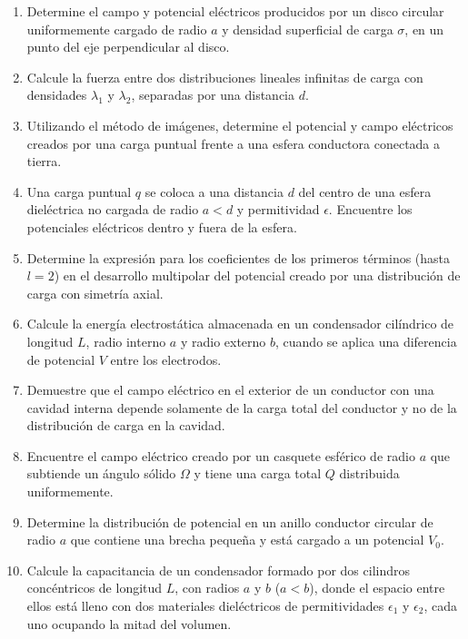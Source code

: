 \documentclass[12pt,a4paper]{book}
\begin{document}
\begin{enumerate}
\item Determine el campo y potencial eléctricos producidos por un disco circular uniformemente cargado de radio $a$ y densidad superficial de carga $\sigma$, en un punto del eje perpendicular al disco.

\item Calcule la fuerza entre dos distribuciones lineales infinitas de carga con densidades $\lambda_1$ y $\lambda_2$, separadas por una distancia $d$.

\item Utilizando el método de imágenes, determine el potencial y campo eléctricos creados por una carga puntual frente a una esfera conductora conectada a tierra.

\item Una carga puntual $q$ se coloca a una distancia $d$ del centro de una esfera dieléctrica no cargada de radio $a < d$ y permitividad $\epsilon$. Encuentre los potenciales eléctricos dentro y fuera de la esfera.

\item Determine la expresión para los coeficientes de los primeros términos (hasta $l=2$) en el desarrollo multipolar del potencial creado por una distribución de carga con simetría axial.

\item Calcule la energía electrostática almacenada en un condensador cilíndrico de longitud $L$, radio interno $a$ y radio externo $b$, cuando se aplica una diferencia de potencial $V$ entre los electrodos.

\item Demuestre que el campo eléctrico en el exterior de un conductor con una cavidad interna depende solamente de la carga total del conductor y no de la distribución de carga en la cavidad.

\item Encuentre el campo eléctrico creado por un casquete esférico de radio $a$ que subtiende un ángulo sólido $\Omega$ y tiene una carga total $Q$ distribuida uniformemente.

\item Determine la distribución de potencial en un anillo conductor circular de radio $a$ que contiene una brecha pequeña y está cargado a un potencial $V_0$.

\item Calcule la capacitancia de un condensador formado por dos cilindros concéntricos de longitud $L$, con radios $a$ y $b$ ($a < b$), donde el espacio entre ellos está lleno con dos materiales dieléctricos de permitividades $\epsilon_1$ y $\epsilon_2$, cada uno ocupando la mitad del volumen.
\end{enumerate}
\end{document}
